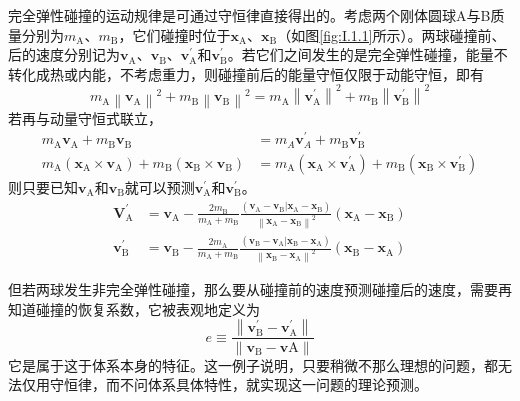 \documentclass[main.tex]{subfiles}
\begin{document}
\begin{example}
    完全弹性碰撞的运动规律是可通过守恒律直接得出的。考虑两个刚体圆球A与B质量分别为$m_\text{A}$、$m_\text{B}$，它们碰撞时位于$\mathbf{x}_\text{A}$、$\mathbf{x}_\text{B}$（如图\ref{fig:I.1.1}所示）。两球碰撞前、后的速度分别记为$\mathbf{v}_\text{A}$、$\mathbf{v}_\text{B}$、$\mathbf{v}_\text{A}^\prime$和$\mathbf{v}_\text{B}^\prime$。若它们之间发生的是完全弹性碰撞，能量不转化成热或内能，不考虑重力，则碰撞前后的能量守恒仅限于动能守恒，即有
    \[m_\text{A}\left\|\mathbf{v}_\text{A}\right\|^2+m_\text{B}\left\|\mathbf{v}_\text{B}\right\|^2=m_\text{A}\left\|\mathbf{v}_\text{A}^\prime\right\|^2+m_\text{B}\left\|\mathbf{v}_\text{B}^\prime\right\|^2\]
    若再与动量守恒式联立，
    \begin{align*}
        m_\text{A}\mathbf{v}_\text{A}+m_\text{B}\mathbf{v}_\text{B}                                                                             & =m_A\mathbf{v}_A^\prime+m_\text{B}\mathbf{v}_\text{B}^\prime                                                                                           \\
        m_\text{A}\left(\mathbf{x}_\text{A}\times\mathbf{v}_\text{A}\right)+m_\text{B}\left(\mathbf{x}_\text{B}\times\mathbf{v}_\text{B}\right) & =m_\text{A}\left(\mathbf{x}_\text{A}\times\mathbf{v}_\text{A}^\prime\right)+m_\text{B}\left(\mathbf{x}_\text{B}\times\mathbf{v}_\text{B}^\prime\right)
    \end{align*}
    则只要已知$\mathbf{v}_\text{A}$和$\mathbf{v}_\text{B}$就可以预测$\mathbf{v}_\text{A}^\prime$和$\mathbf{v}_\text{B}^\prime$。
    \begin{align*}
        \mathbf{V}_\text{A}^\prime & =\mathbf{v}_\text{A}-\frac{2m_\text{B}}{m_\text{A}+m_\text{B}}\frac{\left(\mathbf{v}_\text{A}-\mathbf{v}_\text{B}|\mathbf{x}_\text{A}-\mathbf{x}_\text{B}\right)}{\left\|\mathbf{x}_\text{A}-\mathbf{x}_\text{B}\right\|^2}\left(\mathbf{x}_\text{A}-\mathbf{x}_\text{B}\right) \\
        \mathbf{v}_\text{B}^\prime & =\mathbf{v}_\text{B}-\frac{2m_\text{A}}{m_\text{A}+m_\text{B}}\frac{\left(\mathbf{v}_\text{B}-\mathbf{v}_\text{A}|\mathbf{x}_\text{B}-\mathbf{x}_\text{A}\right)}{\left\|\mathbf{x}_\text{B}-\mathbf{x}_\text{A}\right\|^2}\left(\mathbf{x}_\text{B}-\mathbf{x}_\text{A}\right)
    \end{align*}

    但若两球发生非完全弹性碰撞，那么要从碰撞前的速度预测碰撞后的速度，需要再知道碰撞的恢复系数，它被表观地定义为
    \[e\equiv\frac{\left\|\mathbf{v}_\text{B}^\prime-\mathbf{v}_\text{A}^\prime\right\|}{\left\|\mathbf{v}_\text{B}-\mathbf{v}\text{A}\right\|}\]
    它是属于这于体系本身的特征。这一例子说明，只要稍微不那么理想的问题，都无法仅用守恒律，而不问体系具体特性，就实现这一问题的理论预测。
\end{example}
\end{document}
